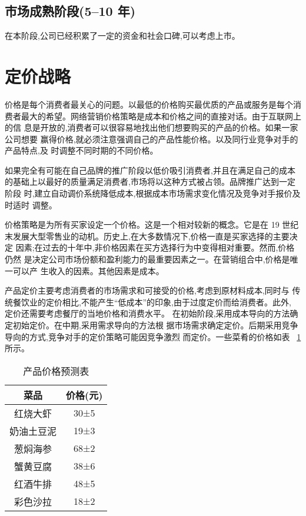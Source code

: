 \subsection{市场成熟阶段(5--10 年)}
在本阶段,公司已经积累了一定的资金和社会口碑,可以考虑上市。

\section{定价战略}
价格是每个消费者最关心的问题。以最低的价格购买最优质的产品或服务是每个消
费者最大的希望。网络营销价格策略是成本和价格之间的直接对话。由于互联网上的信
息是开放的,消费者可以很容易地找出他们想要购买的产品的价格。如果一家公司想要
赢得价格,就必须注意强调自己的产品性能价格。以及同行业竞争对手的产品特点,及
时调整不同时期的不同价格。

如果完全有可能在自己品牌的推广阶段以低价吸引消费者,并且在满足自己的成本
的基础上以最好的质量满足消费者,市场将以这种方式被占领。品牌推广达到一定阶段
时,建立自动调价系统降低成本,根据成本市场需求变化情况及竞争对手报价及时适时
调整。

价格策略是为所有买家设定一个价格。这是一个相对较新的概念。它是在 19 世纪
末发展大型零售业的动机。历史上,在大多数情况下,价格一直是买家选择的主要决定
因素;在过去的十年中,非价格因素在买方选择行为中变得相对重要。然而,价格仍然
是决定公司市场份额和盈利能力的最重要因素之一。在营销组合中,价格是唯一可以产
生收入的因素。其他因素是成本。

产品定价主要考虑消费者的市场需求和可接受的价格,考虑到原材料成本,同时与
传统餐饮业的定价相比,不能产生“低成本”的印象,由于过度定价而给消费者。此外,
定价还需要考虑餐厅的当地价格和消费水平。
在初始阶段,采用成本导向的方法确定初始定价。在中期,采用需求导向的方法根
据市场需求确定定价。后期采用竞争导向的方式,竞争对手的定价策略可能因竞争激烈
而定价。一些菜肴的价格如表 ~\ref{tab:price} 所示。

\begin{table}[ htbp ]
        \caption{产品价格预测表}
        \label{tab:price}
        \centering
        \begin{tabular}{|c|c|}
                \hline
                菜品 & 价格(元)\\ \hline
                红烧大虾 & 30±5\\ \hline
                奶油土豆泥 & 19±3\\ \hline
                葱焖海参 & 68±2\\ \hline
                蟹黄豆腐 & 38±6\\ \hline
                红酒牛排 & 48±5\\ \hline
                彩色沙拉 & 18±2\\ \hline
        \end{tabular}
\end{table}
